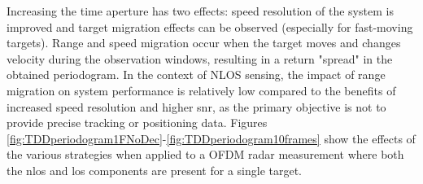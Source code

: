 		     Increasing the time aperture has two effects: speed resolution of the system is improved and target migration effects can be observed (especially for fast-moving targets). 
		     Range and speed migration occur when the target moves and changes velocity during the observation windows, resulting in a return "spread" in the obtained periodogram.
		     In the context of NLOS sensing, the impact of range migration on system performance is relatively low compared to the benefits of increased speed resolution and higher \gls{snr}, as the primary objective is not to provide precise tracking or positioning data.
			Figures \ref{fig:TDDperiodogram1FNoDec}-\ref{fig:TDDperiodogram10frames} show the effects of the various strategies when applied to a OFDM radar measurement where both the \gls{nlos} and \gls{los} components are present for a single target.
			
